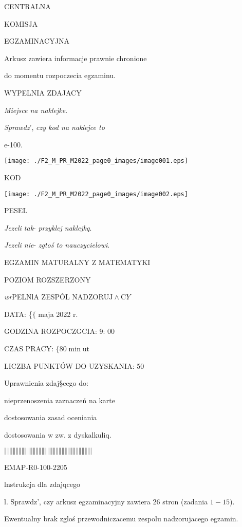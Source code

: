 \documentclass[a4paper,12pt]{article}
\begin{document}
CENTRALNA

KOMISJA

EGZAMINACYJNA

Arkusz zawiera informacje prawnie chronione

do momentu rozpoczecia egzaminu.

WYPELNIA ZDAJACY

{\it Miejsce na naklejke}.

{\it Sprawdz}', {\it czy kod na naklejce to}

e-100.
\begin{center}
\texttt{[image: ./F2\_M\_PR\_M2022\_page0\_images/image001.eps]}
\end{center}
KOD
\begin{center}
\texttt{[image: ./F2\_M\_PR\_M2022\_page0\_images/image002.eps]}
\end{center}
PESEL

{\it Jezeli tak}- {\it przyklej naklejkq}.

{\it Jezeli nie}- {\it zgtoś to nauczycielowi}.

EGZAMIN MATURALNY Z MATEMATYKI

POZIOM ROZSZERZONY

{\it wr}PELNlA ZESPÓL $\mathrm{N}\mathrm{A}\mathrm{D}\mathrm{Z}\mathrm{O}\mathrm{R}\mathrm{U}\mathrm{J}\wedge \mathrm{C}Y$

DATA: \{$\{$ maja 2022 $\mathrm{r}.$

GODZINA ROZPOCZGCIA: 9: 00

CZAS PRACY: $\{80 \displaystyle \min \mathrm{u}\mathrm{t}$

LICZBA PUNKTÓW DO UZYSKANIA: 50

Uprawnienia zdaj\S cego do:

\fbox{} nieprzenoszenia zaznaczeń na karte

\fbox{} dostosowania zasad oceniania

\fbox{} dostosowania w zw. z dyskalkuliq.

$\Vert\Vert\Vert\Vert\Vert\Vert\Vert\Vert\Vert\Vert\Vert\Vert\Vert\Vert\Vert\Vert\Vert\Vert\Vert\Vert\Vert\Vert\Vert\Vert\Vert\Vert\Vert\Vert\Vert\Vert|$

EMAP-R0-100-2205

lnstrukcja dla zdajqcego

l. Sprawdz', czy arkusz egzaminacyjny zawiera 26 stron (zadania $1-15$).

Ewentualny brak zgloś przewodniczacemu zespolu nadzorujacego egzamin.
\end{document}
